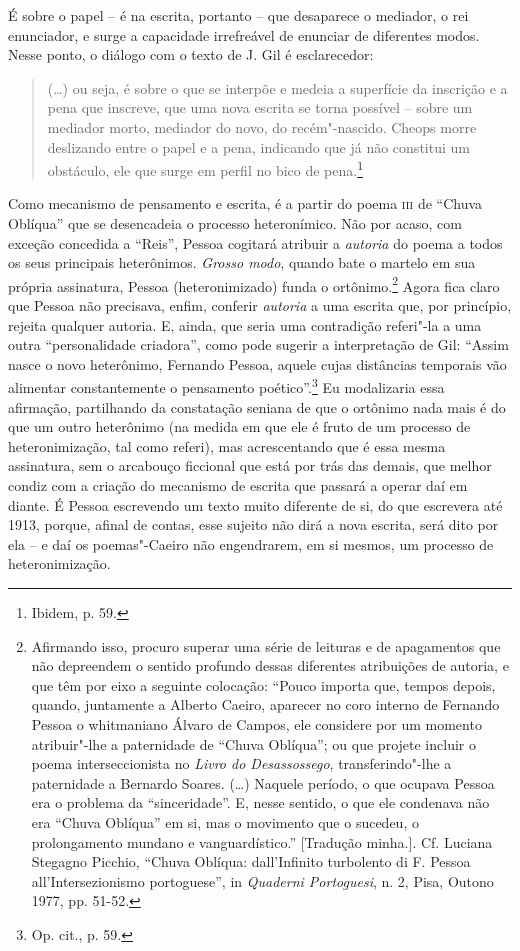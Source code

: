 É sobre o papel -- é na escrita, portanto -- que desaparece o mediador,
o rei enunciador, e surge a capacidade irrefreável de enunciar de
diferentes modos. Nesse ponto, o diálogo com o texto de J. Gil é
esclarecedor:

\begin{quote}
(\ldots{}) ou seja, é sobre o que se interpõe e medeia a superfície da
inscrição e a pena que inscreve, que uma nova escrita se torna possível
-- sobre um mediador morto, mediador do novo, do recém"-nascido. Cheops
morre deslizando entre o papel e a pena, indicando que já não constitui
um obstáculo, ele que surge em perfil no bico de pena.\footnote{Ibidem,
  p. 59.}
\end{quote}

Como mecanismo de pensamento e escrita, é a partir do poema \textsc{iii}
de ``Chuva Oblíqua'' que se desencadeia o processo heteronímico. Não por
acaso, com exceção concedida a ``Reis'', Pessoa cogitará atribuir a
\emph{autoria} do poema a todos os seus principais heterônimos.
\emph{Grosso modo}, quando bate o martelo em sua própria assinatura,
Pessoa (heteronimizado) funda o ortônimo.\footnote{Afirmando isso,
  procuro superar uma série de leituras e de apagamentos que não
  depreendem o sentido profundo dessas diferentes atribuições de
  autoria, e que têm por eixo a seguinte colocação: ``Pouco importa que,
  tempos depois, quando, juntamente a Alberto Caeiro, aparecer no coro
  interno de Fernando Pessoa o whitmaniano Álvaro de Campos, ele
  considere por um momento atribuir"-lhe a paternidade de ``Chuva
  Oblíqua''; ou que projete incluir o poema interseccionista no
  \emph{Livro do Desassossego}, transferindo"-lhe a paternidade a
  Bernardo Soares. (\ldots{}) Naquele período, o que ocupava Pessoa era o
  problema da ``sinceridade''. E, nesse sentido, o que ele condenava não
  era ``Chuva Oblíqua'' em si, mas o movimento que o sucedeu, o
  prolongamento mundano e vanguardístico.'' {[}Tradução minha.{]}. Cf.
  Luciana Stegagno Picchio, ``Chuva Oblíqua: dall'Infinito turbolento di
  F. Pessoa all'Intersezionismo portoguese'', in \emph{Quaderni
  Portoguesi}, n. 2, Pisa, Outono 1977, pp. 51-52.} Agora fica claro que
Pessoa não precisava, enfim, conferir \emph{autoria} a uma escrita que,
por princípio, rejeita qualquer autoria. E, ainda, que seria uma
contradição referi"-la a uma outra ``personalidade criadora'', como pode
sugerir a interpretação de Gil: ``Assim nasce o novo heterônimo,
Fernando Pessoa, aquele cujas distâncias temporais vão alimentar
constantemente o pensamento poético''.\footnote{Op. cit., p. 59.} Eu
modalizaria essa afirmação, partilhando da constatação seniana de que o
ortônimo nada mais é do que um outro heterônimo (na medida em que ele é
fruto de um processo de heteronimização, tal como referi), mas
acrescentando que é essa mesma assinatura, sem o arcabouço ficcional que
está por trás das demais, que melhor condiz com a criação do mecanismo
de escrita que passará a operar daí em diante. É Pessoa escrevendo um
texto muito diferente de si, do que escrevera até 1913, porque, afinal
de contas, esse sujeito não dirá a nova escrita, será dito por ela -- e
daí os poemas"-Caeiro não engendrarem, em si mesmos, um processo de
heteronimização.

